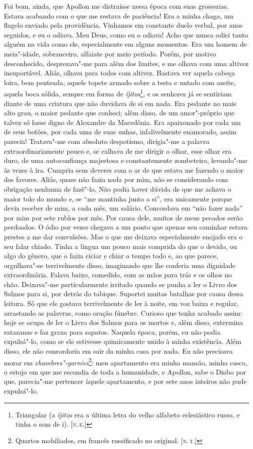 Foi bom, ainda, que Apollon me distraísse nessa época com suas
grosserias. Estava acabando com o que me restava de paciência! Era a
minha chaga, um flagelo enviado pela providência. Vínhamos em constante
duelo verbal, por anos seguidos, e eu o odiava. Meu Deus, como eu o
odiava! Acho que nunca odiei tanto alguém na vida como ele,
especialmente em alguns momentos. Era um homem de meia"-idade,
sobranceiro, alfaiate por meio período. Porém, por motivo desconhecido,
desprezava"-me para além dos limites, e me olhava com uma altivez
insuportável. Aliás, olhava para todos com altivez. Bastava ver aquela
cabeça loira, bem penteada, aquele topete armado sobre a testa e untado
com azeite, aquela boca sólida, sempre em forma de
\emph{íjitza}\footnote{Triangular (a \emph{íjitza} era a última letra do
  velho alfabeto eclesiástico russo, e tinha o som de i). {[}\textsc{n.\,e.}{]}},
e os senhores já se sentiriam diante de uma criatura que não duvidava de
si em nada. Era pedante no mais alto grau, o maior pedante que conheci;
além disso, de um amor"-próprio que talvez só fosse digno de Alexandre da
Macedônia. Era apaixonado por cada um de seus botões, por cada uma de
suas unhas, infalivelmente enamorado, assim parecia! Tratava"-me com
absoluto despotismo, dirigia"-me a palavra extraordinariamente pouco e,
se calhava de me dirigir o olhar, esse olhar era duro, de uma
autoconfiança majestosa e constantemente zombeteiro, levando"-me às vezes
à ira. Cumpria seus deveres com o ar de que estava me fazendo o maior
dos favores. Aliás, quase não fazia nada por mim, não se considerando
com obrigação nenhuma de fazê"-lo. Não podia haver dúvida de que me
achava o maior tolo do mundo e, se ``me mantinha junto a si'', era
unicamente porque devia receber de mim, a cada mês, um salário.
Concordava em ``não fazer nada'' por mim por sete rublos por mês. Por
causa dele, muitos de meus pecados serão perdoados. O ódio por vezes
chegava a um ponto que apenas seu caminhar estava prestes a me dar
convulsões. Mas o que me deixava especialmente enojado era o seu falar
chiado. Tinha a língua um pouco mais comprida do que o devido, ou algo
do gênero, que o fazia ciciar e chiar o tempo todo e, ao que parece,
orgulhava"-se terrivelmente disso, imaginando que lhe conferia uma
dignidade extraordinária. Falava baixo, comedido, com as mãos para trás
e os olhos no chão. Deixava"-me particularmente irritado quando se punha
a ler o Livro dos Salmos para si, por detrás do tabique. Suportei muitas
batalhas por causa dessa leitura. Só que ele gostava terrivelmente de
ler à noite, em voz baixa e regular, arrastando as palavras, como oração
fúnebre. Curioso que tenha acabado assim: hoje se ocupa de ler o Livro
dos Salmos para os mortos e, além disso, extermina ratazanas e faz graxa
para sapatos. Naquela época, porém, eu não podia expulsá"-lo, como se ele
estivesse quimicamente unido à minha existência. Além disso, ele não
concordaria em sair da minha casa por nada. Eu não precisava morar em
\emph{chambres"-garnies}\footnote{Quartos mobiliados, em francês
  russificado no original. {[}\textsc{n.\,t.}{]}}: meu apartamento era minha
mansão, minha casca, o estojo em que me escondia de toda a humanidade, e
Apollon, sabe o Diabo por que, parecia"-me pertencer àquele apartamento,
e por sete anos inteiros não pude expulsá"-lo.

